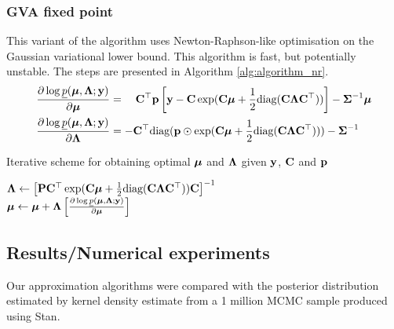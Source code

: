 \documentclass{article}[12pt]
\begin{document}
\subsubsection{GVA fixed point}
This variant of the algorithm uses Newton-Raphson-like optimisation on the Gaussian
variational lower bound. This algorithm is fast, but potentially unstable. The steps are presented in
Algorithm \ref{alg:algorithm_nr}.
\begin{align*}
\frac{\partial \log \underline{p}({\boldsymbol \mu}, {\boldsymbol \Lambda}; {\bf y})}{\partial {\boldsymbol\mu}} &= \quad {\bf C}^\top{\bf p} \left [{\bf y} - {\bf C}\exp({\bf C} {\boldsymbol \mu} + {\frac{1}{2}} \text{diag}({\bf C} {\boldsymbol \Lambda} {\bf C}^\top)) \right ] - {\boldsymbol \Sigma}^{-1} {\boldsymbol \mu} \\
\frac{\partial \log \underline{p}({\boldsymbol \mu}, {\boldsymbol \Lambda}; {\bf y})}{\partial {\boldsymbol\Lambda}} &= -{\bf C}^\top \text{diag}({\bf p} \odot \exp({\bf C} {\boldsymbol \mu} +{\frac{1}{2}} \text{diag}({\bf C} {\boldsymbol \Lambda} {\bf C}^\top))) - {\boldsymbol \Sigma}^{-1}
\end{align*}

\begin{algorithm}
\caption[Algorithm GVA NR]{Iterative scheme for obtaining optimal ${\boldsymbol \mu}$ and ${\boldsymbol \Lambda}$
given ${\bf y}$, ${\bf C}$ and ${\bf p}$}
\label{alg:algorithm_nr}
\begin{algorithmic}
\STATE ${\boldsymbol \Lambda} \leftarrow \left [ {\bf P} {\bf C}^\top \exp({\bf C} {\boldsymbol \mu} + {\frac{1}{2}} \text{diag}({\bf C} {\boldsymbol \Lambda} {\bf C}^\top)) {\bf C} \right ]^{-1}$ \\ [1ex]
\STATE ${\boldsymbol \mu} \leftarrow {\boldsymbol\mu} + {\boldsymbol \Lambda} \left [ \frac{\partial \log \underline{p}({\boldsymbol \mu}, {\boldsymbol \Lambda}; {\bf y})}{\partial {\boldsymbol\mu}} \right ]$
\ENDWHILE
\end{algorithmic}
\end{algorithm}


\subsection{Results/Numerical experiments}\label{sec:results}

Our approximation algorithms were compared with the posterior distribution estimated
by kernel density estimate from a 1 million MCMC sample produced using Stan.
\end{document}
